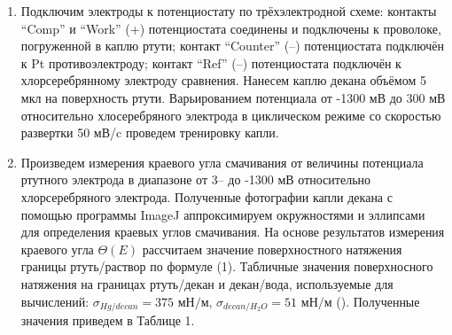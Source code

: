 \documentclass[a4paper,12pt]{article}
\begin{document}
\begin{enumerate}

\item Подключим электроды к потенциостату по трёхэлектродной схеме:
контакты “Comp” и “Work” (+) потенциостата соединены и подключены к проволоке, погруженной в каплю ртути; контакт “Counter” (–) потенциостата подключён
к Pt противоэлектроду; контакт “Ref” (–) потенциостата подключён к хлорсеребрянному электроду сравнения.
Нанесем каплю декана объёмом 5 мкл на поверхность ртути. Варьированием
потенциала от -1300 мВ до 300 мВ относительно хлосеребряного электрода в циклическом режиме со скоростью развертки 50 мВ/c проведем тренировку капли.

\item Произведем измерения краевого угла смачивания от величины потенциала ртутного электрода в диапазоне от 3-- до -1300 мВ относительно хлорсеребряного электрода. Полученные фотографии капли декана с помощью программы ImageJ аппроксимируем окружностями и эллипсами для определения краевых углов смачивания. На основе результатов измерения краевого угла $\Theta(E)$ рассчитаем значение поверхностного натяжения границы ртуть/раствор по формуле (1). Табличные значения поверхносного натяжения на границах ртуть/декан и декан/вода, используемые для вычислений: $\sigma_{Hg/decan} = 375 \text{ мН/м}$, $\sigma_{decan/H_{2}O} = 51 \text{ мН/м}$ (\cite{1}). Полученные значения приведем в Таблице 1.


\end{enumerate}
\end{document}
